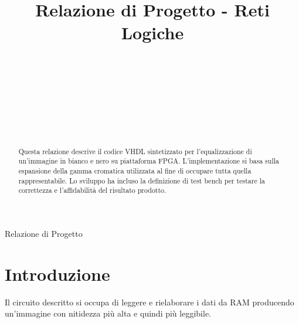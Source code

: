 \documentclass{article}
\begin{document}
\title{Relazione di Progetto - Reti Logiche%
%
}

\author{\\[2pt] 
\\
\\
\and
\\
\\
\\
}

%
%
{Relazione di Progetto} 

\maketitle

\begin{abstract}
Questa relazione descrive il codice VHDL sintetizzato per l'equalizzazione di un'immagine in bianco e nero su piattaforma FPGA. L'implementazione si basa sulla espansione della gamma cromatica utilizzata al fine di occupare tutta quella rappresentabile. Lo sviluppo ha incluso la definizione di test bench per testare la correttezza e l'affidabilità del risultato prodotto. 
\end{abstract}


\section{Introduzione}
\label{intro}
Il circuito descritto si occupa di leggere e rielaborare i dati da RAM producendo un'immagine con nitidezza più alta e quindi più leggibile. 
\end{document}
